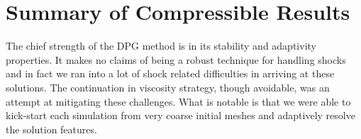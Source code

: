 \documentclass[Dissertation.tex]{subfiles}
\begin{document}
\section{Summary of Compressible Results}
The chief strength of the DPG method is in its stability and adaptivity properties.
It makes no claims of being a robust technique for handling shocks
and in fact we ran into a lot of shock related difficulties in arriving at these solutions.
The continuation in viscosity strategy, though avoidable, was an attempt at mitigating these challenges.
What is notable is that we were able to kick-start each simulation from very coarse initial meshes
and adaptively resolve the solution features.
\end{document}
